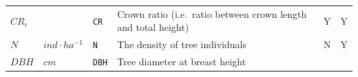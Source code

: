 \documentclass[]{book}
\begin{document}
\begin{longtable}[]{@{}llllll@{}}
\begin{minipage}[t]{0.10\columnwidth}\raggedright
\(CR_i\)\strut
\end{minipage} & \begin{minipage}[t]{0.09\columnwidth}\raggedright
\strut
\end{minipage} & \begin{minipage}[t]{0.06\columnwidth}\raggedright
\texttt{CR}\strut
\end{minipage} & \begin{minipage}[t]{0.43\columnwidth}\raggedright
Crown ratio (i.e.~ratio between crown length and total height)\strut
\end{minipage} & \begin{minipage}[t]{0.07\columnwidth}\raggedright
Y\strut
\end{minipage} & \begin{minipage}[t]{0.07\columnwidth}\raggedright
Y\strut
\end{minipage}\tabularnewline
\begin{minipage}[t]{0.10\columnwidth}\raggedright
\(N\)\strut
\end{minipage} & \begin{minipage}[t]{0.09\columnwidth}\raggedright
\(ind · ha^{-1}\)\strut
\end{minipage} & \begin{minipage}[t]{0.06\columnwidth}\raggedright
\texttt{N}\strut
\end{minipage} & \begin{minipage}[t]{0.43\columnwidth}\raggedright
The density of tree individuals\strut
\end{minipage} & \begin{minipage}[t]{0.07\columnwidth}\raggedright
N\strut
\end{minipage} & \begin{minipage}[t]{0.07\columnwidth}\raggedright
Y\strut
\end{minipage}\tabularnewline
\begin{minipage}[t]{0.10\columnwidth}\raggedright
\(DBH\)\strut
\end{minipage} & \begin{minipage}[t]{0.09\columnwidth}\raggedright
\(cm\)\strut
\end{minipage} & \begin{minipage}[t]{0.06\columnwidth}\raggedright
\texttt{DBH}\strut
\end{minipage} & \begin{minipage}[t]{0.43\columnwidth}\raggedright
Tree diameter at breast height\strut

\end{minipage}
\end{longtable}
\end{document}
